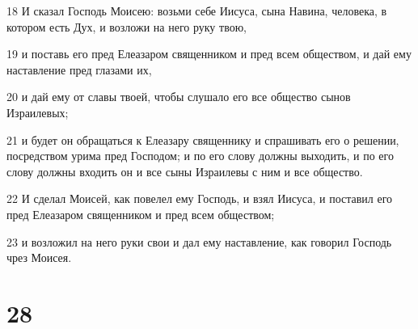 \par 18 И сказал Господь Моисею: возьми себе Иисуса, сына Навина, человека, в котором есть Дух, и возложи на него руку твою,
\par 19 и поставь его пред Елеазаром священником и пред всем обществом, и дай ему наставление пред глазами их,
\par 20 и дай ему от славы твоей, чтобы слушало его все общество сынов Израилевых;
\par 21 и будет он обращаться к Елеазару священнику и спрашивать его о решении, посредством урима пред Господом; и по его слову должны выходить, и по его слову должны входить он и все сыны Израилевы с ним и все общество.
\par 22 И сделал Моисей, как повелел ему Господь, и взял Иисуса, и поставил его пред Елеазаром священником и пред всем обществом;
\par 23 и возложил на него руки свои и дал ему наставление, как говорил Господь чрез Моисея.

\chapter{28}

